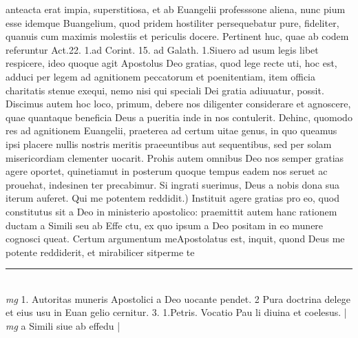 \documentclass{article}
\begin{document}
\begin{pages}
anteacta erat impia, superstitiosa, et ab Euangelii professsone aliena, nunc pium esse idemque  Buangelium, quod pridem hostiliter persequebatur pure, fideliter, quanuis cum maximis molestiis et periculis docere. Pertinent huc, quae ab codem referuntur Act.22. 1.ad Corint. 15. ad Galath. 1.Siuero ad usum legis libet respicere, ideo quoque  agit Apostolus Deo gratias, quod lege recte uti, hoc est, adduci per legem ad agnitionem peccatorum et poenitentiam, item officia charitatis stenue exequi, nemo nisi qui speciali Dei gratia adiuuatur, possit. Discimus autem hoc loco, primum, debere nos diligenter considerare et agnoscere, quae quantaque  beneficia Deus a pueritia inde in nos contulerit. Dehinc, quomodo res ad agnitionem Euangelii, praeterea ad certum uitae genus, in quo queamus ipsi placere nullis nostris meritis praeeuntibus aut sequentibus, sed per solam misericordiam clementer uocarit. Prohis autem omnibus Deo nos semper gratias agere oportet, quinetiamut in posterum quoque  tempus eadem nos seruet ac prouehat, indesinen ter precabimur. Si ingrati suerimus, Deus a nobis dona sua iterum auferet.  \pend\pstart Qui me potentem reddidit.) Instituit agere gratias pro eo, quod constitutus sit a Deo in ministerio apostolico: praemittit autem hanc rationem ductam a Simili seu ab Effe ctu, ex quo ipsum a Deo positam in eo munere cognosci queat. Certum argumentum meApostolatus est, inquit, quond Deus me potente reddiderit, et mirabilicer sitperme te  \pend
\vspace{0.5cm}\noindent
\vspace{0.2cm}\rule{1cm}{0.2pt}\\ 
\hspace{0.2cm}\textit{mg}
\footnotesize 1. Autoritas muneris Apostolici a Deo uocante pendet. 2 Pura doctrina delege et eius usu in Euan gelio cernitur. 3. 1.Petris. Vocatio Pau li diuina et coelesus. 
\normalsize| 
\hspace{0.2cm}\textit{mg}
\footnotesize a Simili siue ab effedu
\normalsize| 

\end{pages}
\end{document}
